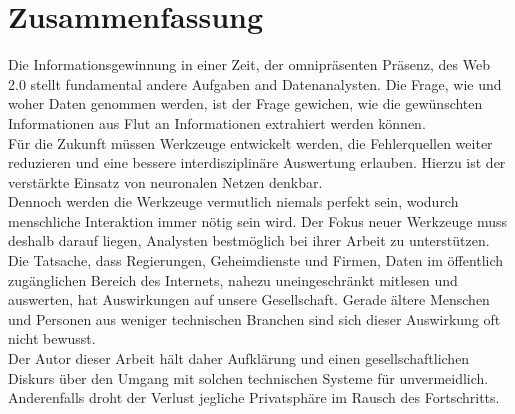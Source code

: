 \documentclass[twoside,a4paper]{article}
\begin{document}
\section{Zusammenfassung}
Die Informationsgewinnung in einer Zeit, der omnipräsenten Präsenz, des Web 2.0 stellt fundamental andere Aufgaben and Datenanalysten. Die Frage, wie und woher Daten genommen werden, ist der Frage gewichen, wie die gewünschten Informationen aus Flut an Informationen extrahiert werden können.\\
Für die Zukunft müssen Werkzeuge entwickelt werden, die Fehlerquellen weiter reduzieren und eine bessere interdisziplinäre Auswertung erlauben. Hierzu ist der verstärkte Einsatz von neuronalen Netzen denkbar.\\
Dennoch werden die Werkzeuge vermutlich niemals perfekt sein, wodurch menschliche Interaktion immer nötig sein wird. Der Fokus neuer Werkzeuge muss deshalb darauf liegen, Analysten bestmöglich bei ihrer Arbeit zu unterstützen.\\
Die Tatsache, dass Regierungen, Geheimdienste und Firmen, Daten im öffentlich zugänglichen Bereich des Internets, nahezu uneingeschränkt mitlesen und auswerten, hat Auswirkungen auf unsere Gesellschaft. Gerade ältere Menschen und Personen aus weniger technischen Branchen sind sich dieser Auswirkung oft nicht bewusst. \\
Der Autor dieser Arbeit hält daher Aufklärung und einen gesellschaftlichen Diskurs über den Umgang mit solchen technischen Systeme für unvermeidlich. Anderenfalls droht der Verlust jegliche Privatsphäre im Rausch des Fortschritts.


\nocite{*}

\end{document}
